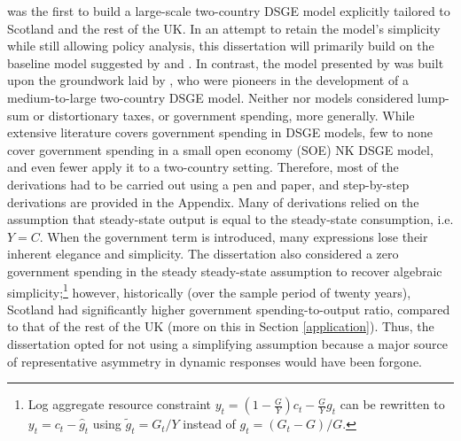 \textcite{ricci_2019_essays} was the first to build a large-scale two-country DSGE model explicitly tailored to Scotland and the rest of the UK. In an attempt to retain the model's simplicity while still allowing policy analysis, this dissertation will primarily build on the baseline model suggested by \textcite{gali_2005_monetary} and \textcite{jordigal_2015_monetary}. In contrast, the model presented by \textcite{ricci_2019_essays} was built upon the groundwork laid by \textcite{rabanal_2010_eurodollar}, who were pioneers in the development of a medium-to-large two-country DSGE model. Neither \textcite{gali_2005_monetary} nor \textcite{jordigal_2015_monetary} models considered lump-sum or distortionary taxes, or government spending, more generally. While extensive literature covers government spending in DSGE models, few to none cover government spending in a small open economy (SOE) NK DSGE model, and even fewer apply it to a two-country setting. Therefore, most of the derivations had to be carried out using a pen and paper, and step-by-step derivations are provided in the Appendix. Many of \citereset\textcite{jordigal_2015_monetary} derivations relied on the assumption that steady-state output is equal to the steady-state consumption, i.e. $Y=C$. When the government term is introduced, many expressions lose their inherent elegance and simplicity. The dissertation also considered a zero government spending in the steady steady-state assumption to recover algebraic simplicity;\enlargethispage{\baselineskip}\footnote{Log aggregate resource constraint $y_t = \left( 1 - \frac{G}{Y}\right)c_t - \frac{G}{Y}g_t$ can be rewritten to $y_t = c_t - \hat{g}_t$ using $\tilde{g}_t = G_t/Y$ instead of $g_t = (G_t - G)/G$.} however, historically (over the sample period of twenty years), Scotland had significantly higher government spending-to-output ratio, compared to that of the rest of the UK (more on this in Section \ref{application}). Thus, the dissertation opted for not using a simplifying assumption because a major source of representative asymmetry in dynamic responses would have been forgone.

